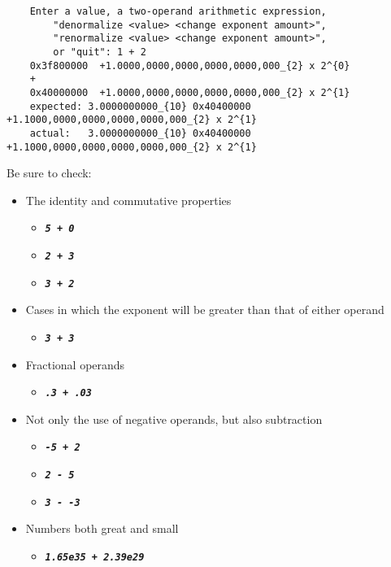     \begin{verbatim}
    Enter a value, a two-operand arithmetic expression,
        "denormalize <value> <change exponent amount>",
        "renormalize <value> <change exponent amount>",
        or "quit": 1 + 2
    0x3f800000	+1.0000,0000,0000,0000,0000,000_{2} x 2^{0}
    +
    0x40000000	+1.0000,0000,0000,0000,0000,000_{2} x 2^{1}
    expected: 3.0000000000_{10}	0x40400000	+1.1000,0000,0000,0000,0000,000_{2} x 2^{1}
    actual:   3.0000000000_{10}	0x40400000	+1.1000,0000,0000,0000,0000,000_{2} x 2^{1}
    \end{verbatim}

    Be sure to check:
    \begin{itemize}
        \item The identity and commutative properties
        \begin{itemize}
            \item[] \texttt{\textbf{\textit{5 + 0}}}
            \item[] \texttt{\textbf{\textit{2 + 3}}}
            \item[] \texttt{\textbf{\textit{3 + 2}}}
        \end{itemize}
        \item Cases in which the exponent will be greater than that of either operand
        \begin{itemize}
            \item[] \texttt{\textbf{\textit{3 + 3}}}
        \end{itemize}
        \item Fractional operands
        \begin{itemize}
            \item[] \texttt{\textbf{\textit{.3 + .03}}}
        \end{itemize}
        \item Not only the use of negative operands, but also subtraction
        \begin{itemize}
            \item[] \texttt{\textbf{\textit{-5 + 2}}}
            \item[] \texttt{\textbf{\textit{2 - 5}}}
            \item[] \texttt{\textbf{\textit{3 - -3}}}
        \end{itemize}
        \item Numbers both great and small
        \begin{itemize}
            \item[] \texttt{\textbf{\textit{1.65e35 + 2.39e29}}}

\end{itemize}
\end{itemize}
